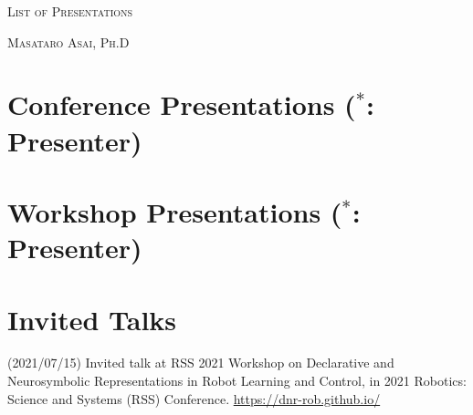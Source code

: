 


\pagestyle{empty}

\begin{center}
{\huge\textsc{List of Presentations}}
\vspace{0.7\baselineskip}

{\Large\textsc{Masataro Asai, Ph.D}}
\vspace{0.5\baselineskip}

\small

\end{center}

\section{Conference Presentations ($^*$: Presenter)}

\nocite{Asai2020}
\nocite{Asai2019a}
\nocite{Asai2019b}
\nocite{Asai2018}
\nocite{Asai2017e}
\nocite{Asai2017b}
\nocite{Asai2016b}
\nocite{Asai2016}
\nocite{Asai2015}
\nocite{Asai2014}
\putbib

\section{Workshop Presentations ($^*$: Presenter)}

\nocite{asaiphd}
\nocite{Asai2020b}
\nocite{Asai2016c}
\nocite{Endo2016}
\nocite{Asai2014b}
\putbib

\section{Invited Talks}

(2021/07/15) Invited talk at RSS 2021 Workshop on Declarative and Neurosymbolic Representations in Robot Learning and Control,
in 2021 Robotics: Science and Systems (RSS) Conference. \url{https://dnr-rob.github.io/}



